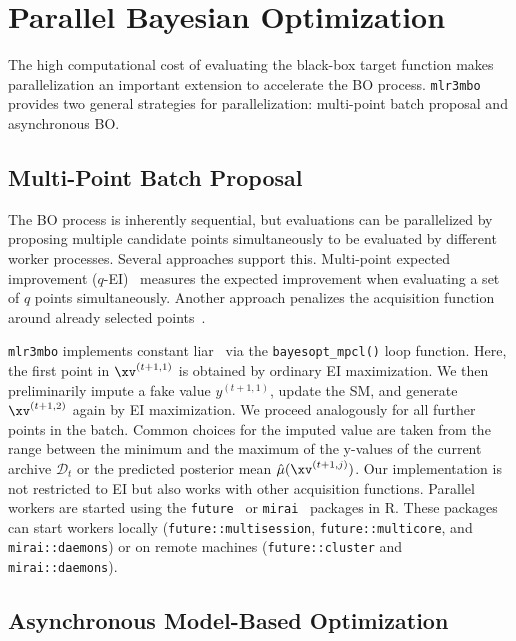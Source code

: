 \documentclass[12pt,letterpaper]{article}
\begin{document}
\section{Parallel Bayesian Optimization}
\label{sec:parallel}

The high computational cost of evaluating the black-box target function makes parallelization an important extension to accelerate the BO process.
\texttt{mlr3mbo} provides two general strategies for parallelization: multi-point batch proposal and asynchronous BO.

\subsection*{Multi-Point Batch Proposal}
\label{sec:multi-point-batch-proposal}

The BO process is inherently sequential, but evaluations can be parallelized by proposing multiple candidate points simultaneously to be evaluated by different worker processes.
Several approaches support this.
Multi-point expected improvement ($q$-EI)~\cite{ginsbourger2010} measures the expected improvement when evaluating a set of $q$ points simultaneously.
Another approach penalizes the acquisition function around already selected points~\cite{gonzalez2016}.

\texttt{mlr3mbo} implements constant liar~\cite{ginsbourger2010} via the \texttt{bayesopt\_mpcl()} loop function.
Here, the first point in $\xv^{(t+1, 1)}$ is obtained by ordinary EI maximization.
We then preliminarily impute a fake value $y^{(t + 1, 1)}$, update the SM, and generate $\xv^{(t + 1, 2)}$ again by EI maximization.
We proceed analogously for all further points in the batch.
Common choices for the imputed value are taken from the range between the minimum and the maximum of the y-values of the current archive $\mathcal{D}_t$ or the predicted posterior mean $\hat\mu(\xv^{(t+1, j)})$.
Our implementation is not restricted to EI but also works with other acquisition functions.
Parallel workers are started using the \texttt{future}~\cite{bengtsson2021} or \texttt{mirai}~\cite{gao2025} packages in R.
These packages can start workers locally (\texttt{future::multisession}, \texttt{future::multicore}, and \texttt{mirai::daemons}) or on remote machines (\texttt{future::cluster} and \texttt{mirai::daemons}).

\subsection*{Asynchronous Model-Based Optimization}
\label{sec:asynchronous-mbo}
\end{document}
